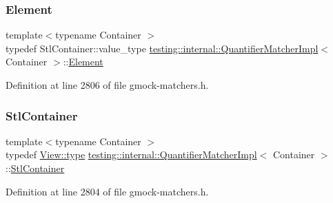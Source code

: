 \subsubsection{\texorpdfstring{Element}{Element}}
{\footnotesize\ttfamily template$<$typename Container $>$ \\
typedef Stl\+Container\+::value\+\_\+type \hyperlink{classtesting_1_1internal_1_1QuantifierMatcherImpl}{testing\+::internal\+::\+Quantifier\+Matcher\+Impl}$<$ Container $>$\+::\hyperlink{classtesting_1_1internal_1_1QuantifierMatcherImpl_a6f73e2e5fa853f8b5fdd33d6a1811f9e}{Element}}



Definition at line 2806 of file gmock-\/matchers.\+h.

\mbox{\label{classtesting_1_1internal_1_1QuantifierMatcherImpl_a7faa9a49c627e6db66e0ff9cdc88b6fc}} 
\subsubsection{\texorpdfstring{Stl\+Container}{StlContainer}}
{\footnotesize\ttfamily template$<$typename Container $>$ \\
typedef \hyperlink{classtesting_1_1internal_1_1StlContainerView_a2b2c63a6dcdbfe63fb0ee121ebf463ba}{View\+::type} \hyperlink{classtesting_1_1internal_1_1QuantifierMatcherImpl}{testing\+::internal\+::\+Quantifier\+Matcher\+Impl}$<$ Container $>$\+::\hyperlink{classtesting_1_1internal_1_1QuantifierMatcherImpl_a7faa9a49c627e6db66e0ff9cdc88b6fc}{Stl\+Container}}



Definition at line 2804 of file gmock-\/matchers.\+h.

\mbox{\label{classtesting_1_1internal_1_1QuantifierMatcherImpl_a341dd7815b3c6090d935026daac6e938}} 
